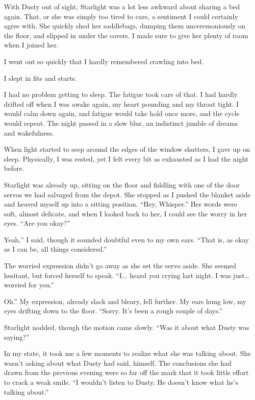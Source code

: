 With Dusty out of sight, Starlight was a lot less awkward about sharing a bed again. That, or she was simply too tired to care, a sentiment I could certainly agree with. She quickly shed her saddlebags, dumping them unceremoniously on the floor, and slipped in under the covers. I made sure to give her plenty of room when I joined her.

I went out so quickly that I hardly remembered crawling into bed.

{\br}%
I slept in fits and starts.

I had no problem getting to sleep. The fatigue took care of that. I had hardly drifted off when I was awake again, my heart pounding and my throat tight. I would calm down again, and fatigue would take hold once more, and the cycle would repeat. The night passed in a slow blur, an indistinct jumble of dreams and wakefulness.

When light started to seep around the edges of the window shutters, I gave up on sleep. Physically, I was rested, yet I felt every bit as exhausted as I had the night before.

Starlight was already up, sitting on the floor and fiddling with one of the door servos we had salvaged from the depot. She stopped as I pushed the blanket aside and heaved myself up into a sitting position. “Hey, Whisper.” Her words were soft, almost delicate, and when I looked back to her, I could see the worry in her eyes. “Are you okay?”

\leavevmode{}Yeah,” I said, though it sounded doubtful even to my own ears. “That is, as okay as I can be, all things considered.”

The worried expression didn’t go away as she set the servo aside. She seemed hesitant, but forced herself to speak. “I... heard you crying last night. I was just… worried for you.”

\leavevmode{}Oh.” My expression, already slack and bleary, fell further. My ears hung low, my eyes drifting down to the floor. “Sorry. It’s been a rough couple of days.”

Starlight nodded, though the motion came slowly. “Was it about what Dusty was saying?”

In my state, it took me a few moments to realize what she was talking about. She wasn’t asking about what Dusty had said, himself. The conclusions she had drawn from the previous evening were so far off the mark that it took little effort to crack a weak smile. “I wouldn’t listen to Dusty. He doesn’t know what he’s talking about.”

